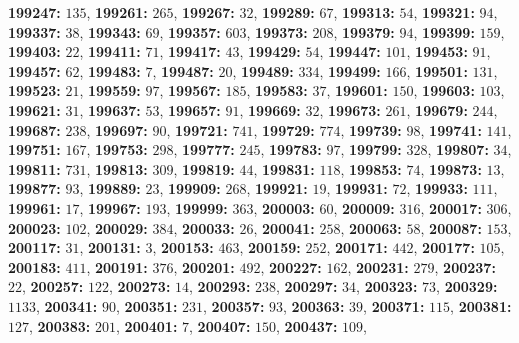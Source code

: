 \textsf{\bfseries 199247:} $135$, \textsf{\bfseries 199261:} $265$, \textsf{\bfseries 199267:} $32$, \textsf{\bfseries 199289:} $67$, \textsf{\bfseries 199313:} $54$, \textsf{\bfseries 199321:} $94$, \textsf{\bfseries 199337:} $38$, \textsf{\bfseries 199343:} $69$, \textsf{\bfseries 199357:} $603$, \textsf{\bfseries 199373:} $208$, \textsf{\bfseries 199379:} $94$, \textsf{\bfseries 199399:} $159$, \textsf{\bfseries 199403:} $22$, \textsf{\bfseries 199411:} $71$, \textsf{\bfseries 199417:} $43$, \textsf{\bfseries 199429:} $54$, \textsf{\bfseries 199447:} $101$, \textsf{\bfseries 199453:} $91$, \textsf{\bfseries 199457:} $62$, \textsf{\bfseries 199483:} $7$, \textsf{\bfseries 199487:} $20$, \textsf{\bfseries 199489:} $334$, \textsf{\bfseries 199499:} $166$, \textsf{\bfseries 199501:} $131$, \textsf{\bfseries 199523:} $21$, \textsf{\bfseries 199559:} $97$, \textsf{\bfseries 199567:} $185$, \textsf{\bfseries 199583:} $37$, \textsf{\bfseries 199601:} $150$, \textsf{\bfseries 199603:} $103$, \textsf{\bfseries 199621:} $31$, \textsf{\bfseries 199637:} $53$, \textsf{\bfseries 199657:} $91$, \textsf{\bfseries 199669:} $32$, \textsf{\bfseries 199673:} $261$, \textsf{\bfseries 199679:} $244$, \textsf{\bfseries 199687:} $238$, \textsf{\bfseries 199697:} $90$, \textsf{\bfseries 199721:} $741$, \textsf{\bfseries 199729:} $774$, \textsf{\bfseries 199739:} $98$, \textsf{\bfseries 199741:} $141$, \textsf{\bfseries 199751:} $167$, \textsf{\bfseries 199753:} $298$, \textsf{\bfseries 199777:} $245$, \textsf{\bfseries 199783:} $97$, \textsf{\bfseries 199799:} $328$, \textsf{\bfseries 199807:} $34$, \textsf{\bfseries 199811:} $731$, \textsf{\bfseries 199813:} $309$, \textsf{\bfseries 199819:} $44$, \textsf{\bfseries 199831:} $118$, \textsf{\bfseries 199853:} $74$, \textsf{\bfseries 199873:} $13$, \textsf{\bfseries 199877:} $93$, \textsf{\bfseries 199889:} $23$, \textsf{\bfseries 199909:} $268$, \textsf{\bfseries 199921:} $19$, \textsf{\bfseries 199931:} $72$, \textsf{\bfseries 199933:} $111$, \textsf{\bfseries 199961:} $17$, \textsf{\bfseries 199967:} $193$, \textsf{\bfseries 199999:} $363$, \textsf{\bfseries 200003:} $60$, \textsf{\bfseries 200009:} $316$, \textsf{\bfseries 200017:} $306$, \textsf{\bfseries 200023:} $102$, \textsf{\bfseries 200029:} $384$, \textsf{\bfseries 200033:} $26$, \textsf{\bfseries 200041:} $258$, \textsf{\bfseries 200063:} $58$, \textsf{\bfseries 200087:} $153$, \textsf{\bfseries 200117:} $31$, \textsf{\bfseries 200131:} $3$, \textsf{\bfseries 200153:} $463$, \textsf{\bfseries 200159:} $252$, \textsf{\bfseries 200171:} $442$, \textsf{\bfseries 200177:} $105$, \textsf{\bfseries 200183:} $411$, \textsf{\bfseries 200191:} $376$, \textsf{\bfseries 200201:} $492$, \textsf{\bfseries 200227:} $162$, \textsf{\bfseries 200231:} $279$, \textsf{\bfseries 200237:} $22$, \textsf{\bfseries 200257:} $122$, \textsf{\bfseries 200273:} $14$, \textsf{\bfseries 200293:} $238$, \textsf{\bfseries 200297:} $34$, \textsf{\bfseries 200323:} $73$, \textsf{\bfseries 200329:} $1133$, \textsf{\bfseries 200341:} $90$, \textsf{\bfseries 200351:} $231$, \textsf{\bfseries 200357:} $93$, \textsf{\bfseries 200363:} $39$, \textsf{\bfseries 200371:} $115$, \textsf{\bfseries 200381:} $127$, \textsf{\bfseries 200383:} $201$, \textsf{\bfseries 200401:} $7$, \textsf{\bfseries 200407:} $150$, \textsf{\bfseries 200437:} $109$, 
